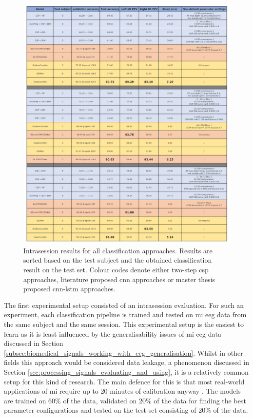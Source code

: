 \begin{figure}[!p]
    \centering
    \includegraphics[width=\linewidth]{../images/results/intrasession.pdf}
    \captionsetup{width=\linewidth}
    \captionsetup{justification=centering}
    \caption{Intrasession results for all classification approaches. Results are sorted based on the test subject and the obtained classification result on the test set. Colour codes denote either two-step \gls{csp} approaches, literature proposed \gls{cnn} approaches or master thesis proposed \gls{cnn}-\gls{lstm} approaches.} 
    \label{fig:results_intrasession}
\end{figure}


The first experimental setup consisted of an intrasession evaluation.
For such an experiment, each classification pipeline is trained and tested on \gls{mi} \gls{eeg} data from the same subject and the same session.
This experimental setup is the easiest to learn as it is least influenced by the generalisability issues of \gls{mi} \gls{eeg} data discussed in Section \ref{subsec:biomedical_signals_working_with_eeg_generalisation}.
Whilst in other fields this approach would be considered data leakage, a phenomenon discussed in Section \ref{sec:processing_signals_evaluating_and_using}, it is a relatively common setup for this kind of research.
The main defence for this is that most real-world applications of \gls{mi} require up to 20 minutes of calibration anyway \citep{eeg_model_eegnet}.
The models are trained on 60\% of the data, validated on 20\% of the data for finding the best parameter configurations and tested on the test set consisting of 20\% of the data.

